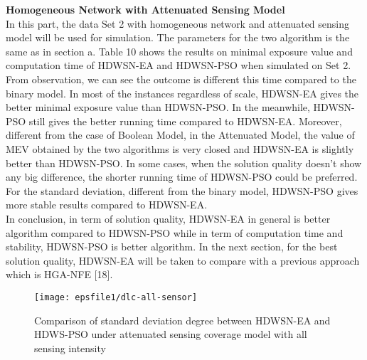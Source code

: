 \documentclass[final]{elsarticle}
\begin{document}
\textbf{Homogeneous Network with Attenuated Sensing Model}\\
In this part, the data Set 2 with homogeneous network and attenuated sensing model will be used for simulation. The parameters for the two algorithm is the same as in section a. Table 10 shows the results on minimal exposure value and computation time of HDWSN-EA and HDWSN-PSO when simulated on Set 2. From observation, we can see the outcome is different this time compared to the binary model. In most of the instances regardless of scale, HDWSN-EA gives the better minimal exposure value than HDWSN-PSO. In the meanwhile, HDWSN-PSO still gives the better running time compared to HDWSN-EA. Moreover, different from the case of Boolean Model, in the Attenuated Model, the value of MEV obtained by the two algorithms is very closed and HDWSN-EA is slightly better than HDWSN-PSO. In some cases, when the solution quality doesn’t show any big difference, the shorter running time of HDWSN-PSO could be preferred. For the standard deviation, different from the binary model, HDWSN-PSO gives more stable results compared to HDWSN-EA.\\
In conclusion, in term of solution quality, HDWSN-EA in general is better algorithm compared to HDWSN-PSO while in term of computation time and stability, HDWSN-PSO is better algorithm. In the next section, for the best solution quality, HDWSN-EA will be taken to compare with a previous approach which is HGA-NFE [18].
\begin{figure*}[h]
	\texttt{[image: epsfile1/dlc-all-sensor]}
	\centering	\caption{Comparison of standard deviation degree between HDWSN-EA and HDWS-PSO under attenuated sensing coverage model with all sensing intensity}
	\label{Fig.14}       %
\end{figure*}
\end{document}
